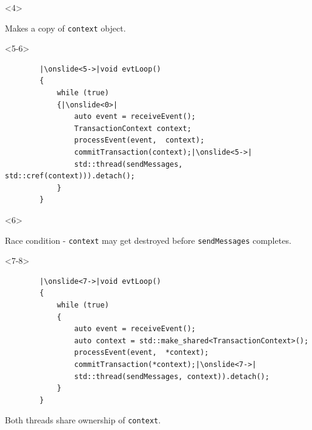 \documentclass{beamer}
\begin{document}
\begin{frame}[fragile,t]
	\begin{onlyenv}
    \begin{alertblock}{}
        Makes a copy of \texttt{context} object.
    \end{alertblock}
	\end{onlyenv}
	
	\begin{onlyenv}<5-6>
	\begin{lstlisting}
        |\onslide<5->|void evtLoop()
        {
            while (true)
			{|\onslide<0>| 
				auto event = receiveEvent();
				TransactionContext context;
				processEvent(event,  context);
				commitTransaction(context);|\onslide<5->|
				std::thread(sendMessages, std::cref(context))).detach();
			}
        }
	\end{lstlisting}
	\end{onlyenv}

	\begin{onlyenv}
    \begin{alertblock}{}
        Race condition - \texttt{context} may get destroyed before \texttt{sendMessages} completes.
    \end{alertblock}
	\end{onlyenv}
	
	\begin{onlyenv}<7-8>
	\begin{lstlisting}
		|\onslide<7->|void evtLoop()
		{
			while (true)
			{
				auto event = receiveEvent();
				auto context = std::make_shared<TransactionContext>();
				processEvent(event,  *context);
				commitTransaction(*context);|\onslide<7->|
				std::thread(sendMessages, context)).detach();
			}
		}
	\end{lstlisting}
    \begin{block}{}
        Both threads share ownership of \texttt{context}.
    \end{block}
	\end{onlyenv}
    

\end{frame}
\end{document}
